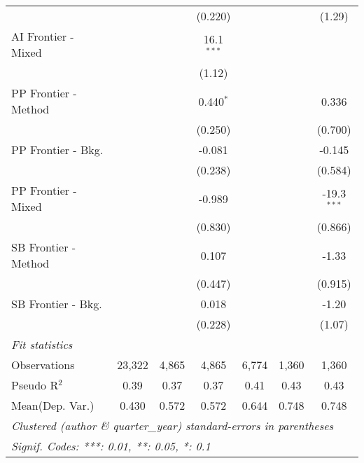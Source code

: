 \begin{tabular}{lcccccc}
                        &              &         & (0.220)      &              &         & (1.29)\\   
   AI Frontier - Mixed  &              &         & 16.1$^{***}$ &              &         &   \\   
                        &              &         & (1.12)       &              &         &   \\   
   PP Frontier - Method &              &         & 0.440$^{*}$  &              &         & 0.336\\   
                        &              &         & (0.250)      &              &         & (0.700)\\   
   PP Frontier - Bkg.   &              &         & -0.081       &              &         & -0.145\\   
                        &              &         & (0.238)      &              &         & (0.584)\\   
   PP Frontier - Mixed  &              &         & -0.989       &              &         & -19.3$^{***}$\\   
                        &              &         & (0.830)      &              &         & (0.866)\\   
   SB Frontier - Method &              &         & 0.107        &              &         & -1.33\\   
                        &              &         & (0.447)      &              &         & (0.915)\\   
   SB Frontier - Bkg.   &              &         & 0.018        &              &         & -1.20\\   
                        &              &         & (0.228)      &              &         & (1.07)\\   
   \midrule
   \emph{Fit statistics}\\
   Observations         & 23,322       & 4,865   & 4,865        & 6,774        & 1,360   & 1,360\\  
   Pseudo R$^2$         & 0.39         & 0.37    & 0.37         & 0.41         & 0.43    & 0.43\\  
Mean(Dep. Var.) & 0.430 & 0.572 & 0.572 & 0.644 & 0.748 & 0.748 \\
   \midrule \midrule
   \multicolumn{7}{l}{\emph{Clustered (author \& quarter\_year) standard-errors in parentheses}}\\
   \multicolumn{7}{l}{\emph{Signif. Codes: ***: 0.01, **: 0.05, *: 0.1}}\\
\end{tabular}
\par\endgroup
